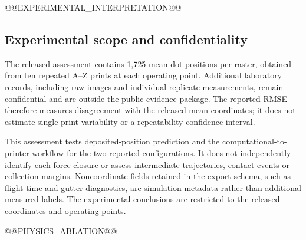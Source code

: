 @@EXPERIMENTAL_INTERPRETATION@@

\subsection{Experimental scope and confidentiality}
The released assessment contains 1,725 mean dot positions per raster, obtained from ten repeated A--Z prints at each operating point. Additional laboratory records, including raw images and individual replicate measurements, remain confidential and are outside the public evidence package. The reported RMSE therefore measures disagreement with the released mean coordinates; it does not estimate single-print variability or a repeatability confidence interval.

This assessment tests deposited-position prediction and the computational-to-printer workflow for the two reported configurations. It does not independently identify each force closure or assess intermediate trajectories, contact events or collection margins. Noncoordinate fields retained in the export schema, such as flight time and gutter diagnostics, are simulation metadata rather than additional measured labels. The experimental conclusions are restricted to the released coordinates and operating points.

@@PHYSICS_ABLATION@@
